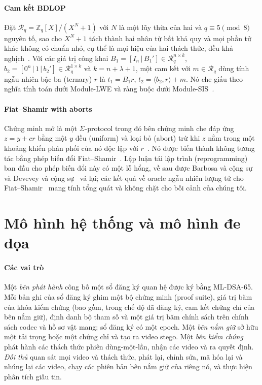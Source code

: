 \documentclass[journal]{IEEEtran}
\newcommand{\Rq}{\mathcal{R}_q}
\begin{document}
\paragraph{Cam kết BDLOP}
Đặt $\Rq=\mathbb{Z}_q[X]/(X^N+1)$ với $N$ là một lũy thừa của hai và $q\equiv5
\pmod 8$ nguyên tố, sao cho $X^N+1$ tách thành hai nhân tử bất khả quy và mọi
phần tử khác không có chuẩn nhỏ, cụ thể là mọi hiệu của hai thách thức, đều khả
nghịch~\cite{ref:ls18}. Với các giá trị công khai
$B_1=[I_n\,|\,B_1']\in\Rq^{n\times k}$, $b_2=[0^n\,|\,1\,|\,b_2']\in\Rq^{1\times k}$
và $k=n+\lambda+1$, một cam kết với $m\in\Rq$ dùng tính ngẫu nhiên bậc ba
(ternary) $r$ là $t_1=B_1r$, $t_2=\langle b_2,r\rangle+m$. Nó che giấu theo
nghĩa tính toán dưới Module-LWE và ràng buộc dưới Module-SIS~\cite{ref:bdlop,ref:ls15}.

\paragraph{Fiat--Shamir with aborts}
Chứng minh mở là một $\Sigma$-protocol trong đó bên chứng minh che đáp ứng
$z=y+cr$ bằng một $y$ đều (uniform) và loại bỏ (abort) trừ khi $z$ nằm trong
một khoảng khiến phân phối của nó độc lập với $r$~\cite{ref:lyu09,ref:lyu12}.
Nó được biến thành không tương tác bằng phép biến đổi
Fiat--Shamir~\cite{ref:fs86}. Lập luận tái lập trình (reprogramming) ban đầu
cho phép biến đổi này có một lỗ hổng, về sau được Barbosa và cộng
sự~\cite{ref:barbosa} và Devevey và cộng sự~\cite{ref:devevey} vá lại; các kết
quả về oracle ngẫu nhiên lượng tử cho Fiat--Shamir~\cite{ref:dfms19,ref:lz19}
mang tính tổng quát và không chặt cho bối cảnh của chúng tôi.

\section{Mô hình hệ thống và mô hình đe dọa}
\label{sec:model}

\paragraph{Các vai trò}
Một \emph{bên phát hành} công bố một sổ đăng ký quan hệ được ký bằng ML-DSA-65.
Mỗi bản ghi của sổ đăng ký ghim một bộ chứng minh (proof suite), giá trị băm của
khóa kiểm chứng (bao gồm, trong chế độ đã đăng ký, cam kết chứng chỉ của bên nắm
giữ), định danh bộ tham số và một giá trị băm chính sách trên chính sách codec
và hồ sơ vật mang; sổ đăng ký có một epoch. Một \emph{bên nắm giữ} sở hữu một
tải trọng hoặc một chứng chỉ và tạo ra video stego. Một \emph{bên kiểm chứng}
phát hành các thách thức phiên dùng-một-lần, nhận các video và ra quyết định.
\emph{Đối thủ} quan sát mọi video và thách thức, phát lại, chỉnh sửa, mã hóa lại
và nhúng lại các video, chạy các phiên bản bên nắm giữ của riêng nó, và thực
hiện phân tích giấu tin.
\end{document}
